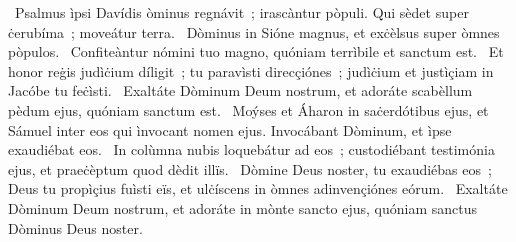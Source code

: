 {~Psalmus ìpsi Davídis}
{%
òminus regnávit~; irascàntur pòpuli. Qui sèdet super ċerubíma~; moveátur terra.
~Dòminus in Sióne magnus, et exċèlsus super òmnes pòpulos.
~Confiteàntur nómini tuo magno, quóniam terrìbile et sanctum est.
~Et honor reġis judìċium díligit~; tu paravìsti direcçiónes~; judìċium et justìçiam in Jacóbe tu feċìsti.
~Exaltáte Dòminum Deum nostrum, et adoráte scabèllum pèdum ejus, quóniam sanctum est.
~Moýses et Áharon in saċerdótibus ejus, et Sámuel inter eos qui ìnvocant nomen ejus. Invocábant Dòminum, et ìpse exaudiébat eos.
~In colùmna nubis loquebátur ad eos~; custodiébant testimónia ejus, et praeċèptum quod dèdit illïs.
~Dòmine Deus noster, tu exaudiébas eos~; Deus tu propìçius fuìsti eïs, et ulċíscens in òmnes adinvençiónes eórum.
~Exaltáte Dòminum Deum nostrum, et adoráte in mònte sancto ejus, quóniam sanctus Dòminus Deus noster.
}
